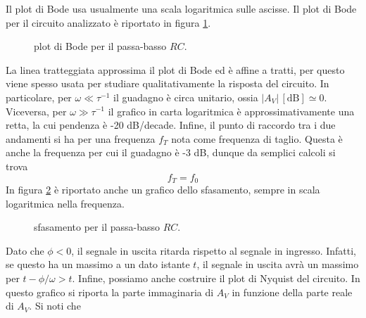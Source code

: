 \documentclass[a4paper, 11pt]{article}
\begin{document}
	Il plot di Bode usa usualmente una scala logaritmica sulle ascisse. Il plot di Bode per il circuito analizzato è riportato in figura \ref{fig:bodepassabasso}.
	\begin{figure}[h!]
		\centering
		\caption{plot di Bode per il passa-basso $RC$.}
		\label{fig:bodepassabasso}
	\end{figure}
	La linea tratteggiata approssima il plot di Bode ed è affine a tratti, per questo viene spesso usata per studiare qualitativamente la risposta del circuito. In particolare, per $\omega\ll\tau^{-1}$ il guadagno è circa unitario, ossia $|A_V|\,[\mathrm{dB}]\simeq0$. Viceversa, per $\omega\gg\tau^{-1}$ il grafico in carta logaritmica è approssimativamente una retta, la cui pendenza è -20 dB/decade. Infine, il punto di raccordo tra i due andamenti si ha per una frequenza $f_T$ nota come frequenza di taglio. Questa è anche la frequenza per cui il guadagno è -3 dB, dunque da semplici calcoli si trova
	\[f_T=f_0\]
	In figura \ref{fig:phipassabasso} è riportato anche un grafico dello sfasamento, sempre in scala logaritmica nella frequenza.
	\begin{figure}[h!]
		\centering
		\caption{sfasamento per il passa-basso $RC$.}
		\label{fig:phipassabasso}
	\end{figure}
	Dato che $\phi<0$, il segnale in uscita ritarda rispetto al segnale in ingresso. Infatti, se questo ha un massimo a un dato istante $t$, il segnale in uscita avrà un massimo per $t-\phi/\omega>t$.
	Infine, possiamo anche costruire il plot di Nyquist del circuito. In questo grafico si riporta la parte immaginaria di $A_V$ in funzione della parte reale di $A_V$. Si noti che
\end{document}
